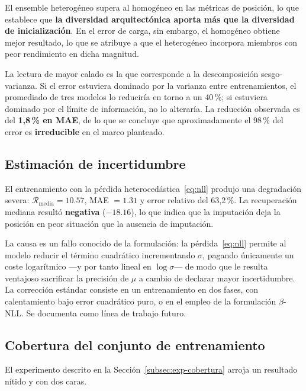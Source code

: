 El ensemble heterogéneo supera al homogéneo en las métricas de posición, lo que establece que
\textbf{la diversidad arquitectónica aporta más que la diversidad de inicialización}. En el error de
carga, sin embargo, el homogéneo obtiene mejor resultado, lo que se atribuye a que el heterogéneo
incorpora miembros con peor rendimiento en dicha magnitud.

La lectura de mayor calado es la que corresponde a la descomposición sesgo-varianza. Si el error
estuviera dominado por la varianza entre entrenamientos, el promediado de tres modelos lo reduciría
en torno a un 40\,\%; si estuviera dominado por el límite de información, no lo alteraría. La
reducción observada es del \textbf{1,8\,\% en MAE}, de lo que se concluye que aproximadamente el
98\,\% del error es \textbf{irreducible} en el marco planteado.

\subsection{Estimación de incertidumbre}
\label{subsec:res-hetero}

El entrenamiento con la pérdida heterocedástica~\eqref{eq:nll} produjo una degradación severa:
$\mathcal{R}_{\text{media}} = 10.57$, MAE $= 1.31$ y error relativo del 63,2\,\%. La recuperación
mediana resultó \textbf{negativa} ($-18.16$), lo que indica que la imputación deja la posición en
peor situación que la ausencia de imputación.

La causa es un fallo conocido de la formulación: la pérdida~\eqref{eq:nll} permite al modelo reducir
el término cuadrático incrementando $\sigma$, pagando únicamente un coste logarítmico ---y por tanto
lineal en $\log\sigma$--- de modo que le resulta ventajoso sacrificar la precisión de $\mu$ a cambio
de declarar mayor incertidumbre. La corrección estándar consiste en un entrenamiento en dos fases,
con calentamiento bajo error cuadrático puro, o en el empleo de la formulación $\beta$-NLL. Se
documenta como línea de trabajo futuro.

\subsection{Cobertura del conjunto de entrenamiento}
\label{subsec:res-cobertura}

El experimento descrito en la Sección~\ref{subsec:exp-cobertura} arroja un resultado nítido y con
dos caras.

